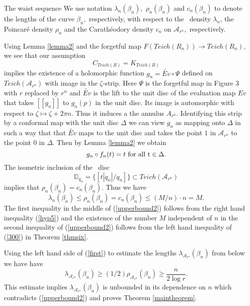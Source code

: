 \documentclass[12pt]{amsart}
\theoremstyle{remark}
\theoremstyle{definition}
\theoremstyle{definition}
\begin{document}
\begin{section}{The waist sequence}
We use notation $\lambda_n(\beta_n),$ $\rho_n(\beta_n)$ and $c_n(\beta_n)$ to denote the lengths of the curve $\beta_n,$ respectively, with respect to the 
\te\ density $\lambda_n$, the Poincar\'e density $\rho_n$ and the Carath\'eodory
density $c_n$ on ${\mathcal A}_{r^n},$ respectively. 
    
  Using Lemma \ref{lemma2} and the forgetful map $F(Teich(R_n)) \rightarrow Teich(R_n),$ we see that our assumption 
  $$C_{Teich(R)} = K_{Teich(R)}$$  implies the existence of  a holomorphic function $g_n = 
  \widetilde{Ev} \circ \Psi$ defined on $Teich({\mathcal A}_{r^n})$ with image in the $\zeta$-strip.  Here $\Psi$ is the forgetful map in Figure 3 with $r$ replaced by $r^n$ and 
  $\widetilde{Ev}$ is the lift to the unit disc of the evaluation map $Ev$ that takes $[[g_n]]$ to $g_n(p)$ in the unit disc.  Its image is automorphic with respect to $\zeta \mapsto \zeta + 2\pi n.$  Thus it induces a  the annulus $A_{r^n}.$     
  Identifying this strip by a conformal map with the unit disc $\Delta$ we can view $g_n$ as mapping 
  onto $\Delta$ in such a way that  that $\widetilde{Ev}$ maps to the unit disc and takes the point $1$ 
  in  ${\mathcal A}_{r^n}$ to the point $0$ in $\Delta.$  Then  by Lemma \ref{lemma2} we obtain
  \begin{equation}\label{hyp5}
  g_n \circ f_n(t)=t {\rm \ for \ all \ t \in \Delta.}
  \end{equation}  
   The 
  isometric inclusion of the  \te\ disc 
  $${\mathbb D}_{q_n}= \{[t|q_n|/q_n]\} \subset Teich(\mathcal{A}_{r^n})$$ implies that  
  $\rho_n(\beta_n)=c_n(\beta_n).$
  Thus  we have 
  \begin{equation}\label{upperbound2}
  \lambda_n(\beta_n) \leq \rho_n(\beta_n) = c_n(\beta_n) \leq (M/n) \cdot n = M.
  \end{equation}
  The first inequality in the middle of (\ref{upperbound2}) follows from the right hand inequality (\ref{hyp5})
  and the existence of the number $M$ independent of $n$  in the 
  second inequality of  (\ref{upperbound2}) follows from the left hand inequality of  (\ref{300})  in Theorem \ref{thmsix}.
  
    
  
  
 Using the left hand side of (\ref{first}) to estimate the lengths $\lambda_{{\mathcal A}_{r^n}}(\beta_n)$   from below we have have
   \begin{equation}\label{above}\lambda_{{\mathcal A}_{r^n}}(\beta_n) \geq (1/2) \rho_{{\mathcal A}_{r^n}}(\beta_n) \geq \frac{n}{2\log r}.\end{equation}
    This estimate implies $\lambda_{{\mathcal A}_{r^n}}(\beta_n)$ is unbounded in its dependence on $n$ which contradicts (\ref{upperbound2}) and proves Theorem \ref{maintheorem}.
  \end{section}
  
\end{document}
